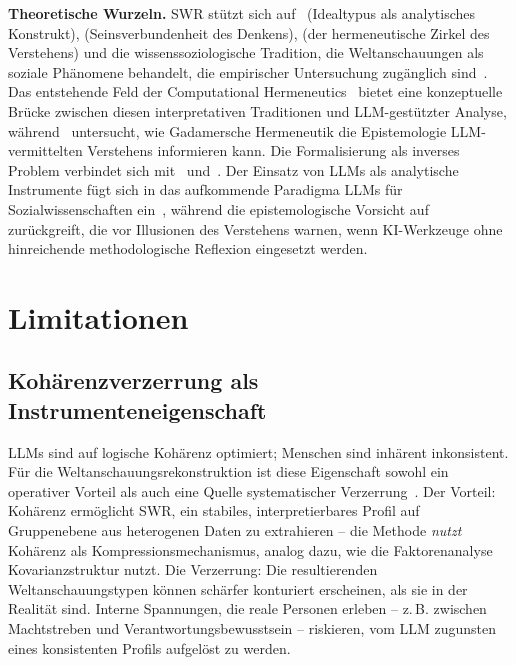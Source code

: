 \documentclass[11pt,a4paper]{article}
\begin{document}
\textbf{Theoretische Wurzeln.} SWR stützt sich auf~\citet{Weber1904} (Idealtypus als analytisches Konstrukt), \citet{Mannheim1929} (Seinsverbundenheit des Denkens), \citet{Gadamer1960} (der hermeneutische Zirkel des Verstehens) und die wissenssoziologische Tradition, die Weltanschauungen als soziale Phänomene behandelt, die empirischer Untersuchung zugänglich sind~\citep{BergerLuckmann1966}. Das entstehende Feld der Computational Hermeneutics~\citep{Kommers2026} bietet eine konzeptuelle Brücke zwischen diesen interpretativen Traditionen und LLM-gestützter Analyse, während~\citet{Hornby2024} untersucht, wie Gadamersche Hermeneutik die Epistemologie LLM-vermittelten Verstehens informieren kann. Die Formalisierung als inverses Problem verbindet sich mit~\citet{Tarantola2005} und~\citet{Hadamard1923}. Der Einsatz von LLMs als analytische Instrumente fügt sich in das aufkommende Paradigma \glqq{}LLMs für Sozialwissenschaften\grqq{} ein~\citep{Ziems2024, Bail2024}, während die epistemologische Vorsicht auf~\citet{Messeri2024} zurückgreift, die vor \glqq{}Illusionen des Verstehens\grqq{} warnen, wenn KI-Werkzeuge ohne hinreichende methodologische Reflexion eingesetzt werden.


\section{Limitationen}
\label{sec:limitations}

\subsection{Kohärenzverzerrung als Instrumenteneigenschaft}
\label{sec:limitations:coherence}

LLMs sind auf logische Kohärenz optimiert; Menschen sind inhärent inkonsistent. Für die Weltanschauungsrekonstruktion ist diese Eigenschaft sowohl ein operativer Vorteil als auch eine Quelle systematischer Verzerrung~\citep{Geiger2026PaperA}. Der Vorteil: Kohärenz ermöglicht SWR, ein stabiles, interpretierbares Profil auf Gruppenebene aus heterogenen Daten zu extrahieren -- die Methode \emph{nutzt} Kohärenz als Kompressionsmechanismus, analog dazu, wie die Faktorenanalyse Kovarianzstruktur nutzt. Die Verzerrung: Die resultierenden Weltanschauungstypen können schärfer konturiert erscheinen, als sie in der Realität sind. Interne Spannungen, die reale Personen erleben -- z.\,B. zwischen Machtstreben und Verantwortungsbewusstsein -- riskieren, vom LLM zugunsten eines konsistenten Profils aufgelöst zu werden.
\end{document}
